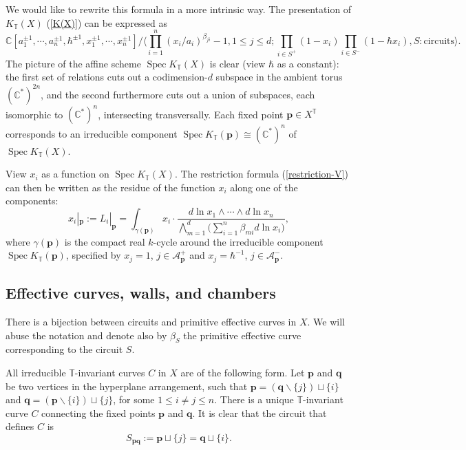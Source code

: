 \documentclass[10pt]{amsart}
\theoremstyle{definition}
\def\CC{{\mathbb{C}}}
\def\TT{\mathbb{T}}
\newcommand{\bp}{\mathbf{p}}
\newcommand{\bq}{\mathbf{q}}
\newcommand{\cA}{\mathcal{A}}
\newcommand{\Spec}{\operatorname{Spec}}
\theoremstyle{definition}
\numberwithin{equation}{section}
\theoremstyle{Theorem}
\begin{document}
We would like to rewrite this formula in a more intrinsic way. The presentation of $K_\TT (X)$ (\ref{K(X)}) can be expressed as
$$
\CC [ a_1^{\pm 1}, \cdots, a_n^{\pm 1}, \hbar^{\pm 1}, x_1^{\pm 1}, \cdots, x_n^{\pm 1} ] / \langle \prod_{i=1}^n (x_i / a_i)^{\beta_{ji}} - 1, 1\leq j\leq d;   \prod_{i\in S^+} (1-x_i) \prod_{i\in S^-} (1- \hbar x_i) , S: \text{circuits} \rangle.
$$
The picture of the affine scheme $\Spec K_\TT (X)$ is clear (view $\hbar$ as a constant): the first set of relations cuts out a codimension-$d$ subspace in the ambient torus $(\CC^*)^{2n}$, and the second furthermore cuts out a union of subspaces, each isomorphic to $(\CC^*)^n$, intersecting transversally. Each fixed point $\bp \in X^\TT$ corresponds to an irreducible component $\Spec K_\TT (\bp) \cong (\CC^*)^n$ of $\Spec K_\TT (X)$.

View $x_i$ as a function on $\Spec K_\TT (X)$. The restriction formula (\ref{restriction-V}) can then be written as the residue of the function $x_i$ along one of the components:
$$
x_i |_\bp :=  L_i |_{\bp} = \int_{\gamma(\bp)} x_i \cdot \frac{d\ln x_1 \wedge \cdots \wedge d\ln x_n}{\bigwedge_{m=1}^d \Big( \sum_{i=1}^n \beta_{mi} d\ln x_i \Big) }  ,
$$
where $\gamma(\bp)$ is the compact real $k$-cycle around the irreducible component $\Spec K_\TT (\bp)$, specified by $x_j = 1$, $j\in \cA_\bp^+$ and $x_j = \hbar^{-1}$, $j\in \cA_\bp^-$.






\subsection{Effective curves, walls, and chambers} \label{section-eff}



There is a bijection \cite{Kon} between circuits and primitive effective curves in $X$. We will abuse the notation and denote also by $\beta_S$ the primitive effective curve corresponding to the circuit $S$.

All irreducible $\TT$-invariant curves $C$ in $X$ are of the following form. Let $\bp$ and $\bq$ be two vertices in the hyperplane arrangement, such that $\bp = (\bq \backslash \{j\} ) \sqcup \{i\}$ and $\bq = (\bp \backslash \{i\} ) \sqcup \{j\}$, for some $1 \leq i\neq j\leq n$. There is a unique $\TT$-invariant curve $C$ connecting the fixed points $\bp$ and $\bq$. It is clear that the circuit that defines $C$ is
$$
S_{\bp \bq} := \bp \sqcup \{j\} = \bq \sqcup \{ i \}.
$$
\end{document}
